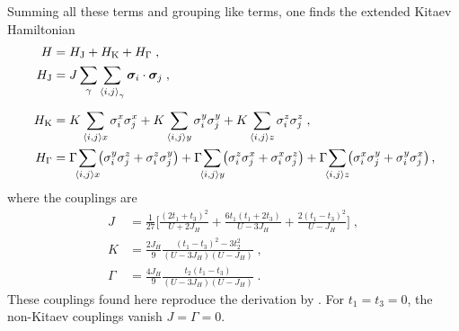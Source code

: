 Summing all these terms and grouping like terms, one finds the extended Kitaev Hamiltonian
\begin{align}\hspace*{-5mm}
H &= H_{\text{J}} + H_{\text{K}}+ H_{\Gamma}\;,  \label{eq:ext-Ham}
\\
    H_{\text{J}} &= J \sum_{\gamma} \sum_{\left< i,j\right>_\gamma}
         \bm{\sigma}_i \cdot \bm{\sigma}_j    \; , \\[5pt]
    \hspace*{-5mm}
    H_{\text{K}} &=   K \sum_{\left< i,j\right>x} \sigma_i^x  \sigma_j^x    +  K \sum_{\left< i,j\right>y}  \sigma_i^y  \sigma_j^y     +  K \sum_{\left< i,j\right>z}  \sigma_i^z  \sigma_j^z     \; , \\
    \hspace*{-5mm}
    H_{\Gamma} &=
     \Gamma \!\!\sum_{\left< i,j\right>x}\!\! \left(  \sigma_i^y  \sigma_j^z + \sigma_i^z  \sigma_j^y \right) +\Gamma\!\! \sum_{\left< i,j\right>y}\!\! \left(  \sigma_i^z  \sigma_j^x + \sigma_i^x  \sigma_j^z \right) + \Gamma \!\!\sum_{\left< i,j\right>z} \!\!\left(  \sigma_i^x  \sigma_j^y + \sigma_i^y  \sigma_j^x \right), \!\!
\end{align}
where the couplings are %
\begin{align}
    J   &=  \frac{1}{27} \Big[
    \frac{(2  t_{1}+ t_{3})^2}{ U+2J_H}  +\frac{6t_{1} ( t_{1}+2  t_{3})}{U-3J_H}  + \frac{2(t_{1}-t_{3})^2}{U-J_H}  \Big]\;, \label{eq:II-1-J}    \\
     K&=\frac{2J_H}{9} \frac{ (t_{1}-t_3)^2-3  t_{2}^2   }{(U-3J_H)(U-J_H)}  \; , \label{eq:II-1-K} \\
     \Gamma &=  \frac{4J_H}{9}  \frac{t_{2} ( t_{1}- t_{3})}{(U-3J_H)(U-J_H)} \; . \label{eq:II-1-gamma}
\end{align}
These couplings found here reproduce the derivation by \cite{Rau2014}. %
For $t_1=t_3=0$, the non-Kitaev couplings vanish $J=\Gamma=0$.


